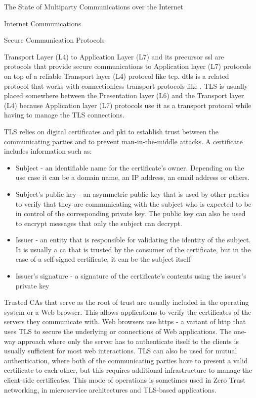 \begin{frame}[fragile]{The State of Multiparty Communications over the
Internet}
\begin{block}{Internet Communications}
\begin{block}{Secure Communication Protocols}
\begin{block}{Transport Layer (L4) to Application Layer (L7)}
\protect\hypertarget{transport-layer-l4-to-application-layer-l7}{}
 \autocite{tlsRFC} and its precursor \gls{ssl} are protocols
that provide secure communications to Application layer (L7) protocols
on top of a reliable Transport layer (L4) protocol like \gls{tcp}.
\gls{dtls} is a related protocol that works with connectionless
transport protocols like . TLS is usually placed somewhere
between the Presentation layer (L6) and the Transport layer (L4) because
Application layer (L7) protocols use it as a transport protocol while
having to manage the TLS connections.

TLS relies on digital certificates and \gls{pki} to establish trust
between the communicating parties and to prevent man-in-the-middle
attacks. A certificate includes information such as:

\begin{itemize}
\tightlist
\item
  Subject - an identifiable name for the certificate's owner. Depending
  on the use case it can be a domain name, an IP address, an email
  address or others.
\item
  Subject's public key - an asymmetric public key that is used by other
  parties to verify that they are communicating with the subject who is
  expected to be in control of the corresponding private key. The public
  key can also be used to encrypt messages that only the subject can
  decrypt.
\item
  Issuer - an entity that is responsible for validating the identity of
  the subject. It is usually a \gls{ca} that is trusted by the consumer
  of the certificate, but in the case of a self-signed certificate, it
  can be the subject itself
\item
  Issuer's signature - a signature of the certificate's contents using
  the issuer's private key
\end{itemize}

Trusted CAs that serve as the root of trust are usually included in the
operating system or a Web browser. This allows applications to verify
the certificates of the servers they communicate with. Web browsers use
\gls{https} \autocite{httpsRFC} - a variant of \gls{http} that uses TLS
to secure the underlying  or  connections of Web
applications. The one-way approach where only the server has to
authenticate itself to the clients is usually sufficient for most web
interactions. TLS can also be used for mutual authentication, where both
of the communicating parties have to present a valid certificate to each
other, but this requires additional infrastructure to manage the
client-side certificates. This mode of operations is sometimes used in
Zero Trust networking, in microservice architectures and TLS-based
 applications.


\end{block}
\end{block}
\end{block}
\end{frame}

